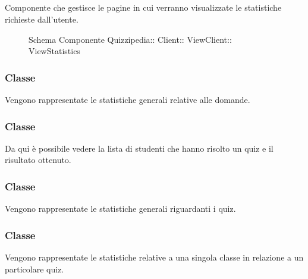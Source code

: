 \subsection{}
Componente che gestisce le pagine in cui verranno visualizzate le statistiche richieste dall'utente.
\begin{figure}[H]
\centering
\noindent{}
\caption[Schema Componente ViewStatistics]{Schema Componente Quizzipedia:: Client:: ViewClient:: ViewStatistics}
\end{figure}
\subsubsection{Classe }
Vengono rappresentate le statistiche generali relative alle domande.
\begin{itemize}
\end{itemize}
\subsubsection{Classe }
Da qui è possibile vedere la lista di studenti che hanno risolto un quiz e il risultato ottenuto.
\begin{itemize}
\end{itemize}
\subsubsection{Classe }
Vengono rappresentate le statistiche generali riguardanti i quiz.
\begin{itemize}
\end{itemize}
\subsubsection{Classe }
Vengono rappresentate le statistiche relative a una singola classe in relazione a un particolare quiz.
\begin{itemize}
\end{itemize}
